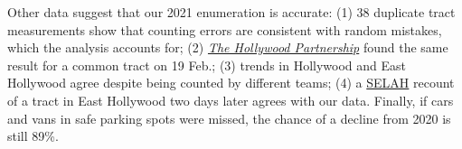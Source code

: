\documentclass[11pt]{article}
\def\selah{SELAH}
\begin{document}
Other data suggest that our 2021 enumeration is accurate: (1) 38 duplicate tract measurements 
show that counting errors are consistent with random mistakes, which the analysis accounts for; (2) 
\href{https://hollywoodpartnership.com/}{\it The Hollywood Partnership} found the same result for
a common tract on 19 Feb.; (3) trends in Hollywood and East Hollywood agree despite being counted 
by different teams; (4) a \href{https://selahnch.org}{\selah} recount of a tract in East Hollywood two 
days later agrees with our data. Finally, if cars and vans in safe parking spots were missed, the chance 
of a decline from 2020 is still 89\%.\\
\end{document}
